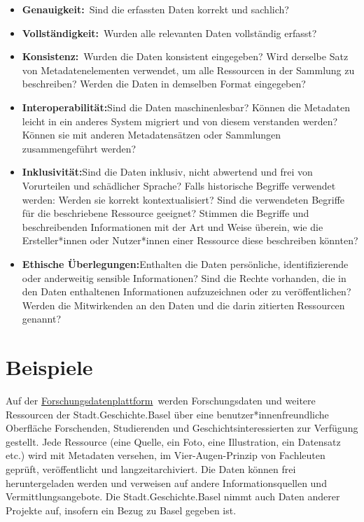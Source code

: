 \documentclass[
  letterpaper,
  DIV=11,
  numbers=noendperiod]{scrartcl}
\providecommand{\tightlist}{%
  \setlength{\itemsep}{0pt}\setlength{\parskip}{0pt}}\usepackage{longtable,booktabs,array}
\begin{document}
\begin{itemize}
\tightlist
\item
  \textbf{Genauigkeit:}~Sind die erfassten Daten korrekt und sachlich?
\item
  \textbf{Vollständigkeit:}~Wurden alle relevanten Daten vollständig
  erfasst?
\item
  \textbf{Konsistenz:}~Wurden die Daten konsistent eingegeben? Wird
  derselbe Satz von Metadatenelementen verwendet, um alle Ressourcen in
  der Sammlung zu beschreiben? Werden die Daten in demselben Format
  eingegeben?
\item
  \textbf{Interoperabilität:}Sind die Daten maschinenlesbar? Können die
  Metadaten leicht in ein anderes System migriert und von diesem
  verstanden werden? Können sie mit anderen Metadatensätzen oder
  Sammlungen zusammengeführt werden?
\item
  \textbf{Inklusivität:}Sind die Daten inklusiv, nicht abwertend und
  frei von Vorurteilen und schädlicher Sprache? Falls historische
  Begriffe verwendet werden: Werden sie korrekt kontextualisiert? Sind
  die verwendeten Begriffe für die beschriebene Ressource geeignet?
  Stimmen die Begriffe und beschreibenden Informationen mit der Art und
  Weise überein, wie die Ersteller*innen oder Nutzer*innen einer
  Ressource diese beschreiben könnten?
\item
  \textbf{Ethische Überlegungen:}Enthalten die Daten persönliche,
  identifizierende oder anderweitig sensible Informationen? Sind die
  Rechte vorhanden, die in den Daten enthaltenen Informationen
  aufzuzeichnen oder zu veröffentlichen? Werden die Mitwirkenden an den
  Daten und die darin zitierten Ressourcen genannt?
\end{itemize}

\section{Beispiele}\label{beispiele}

Auf der
\href{https://forschung.stadtgeschichtebasel.ch/}{Forschungsdatenplattform}~werden
Forschungsdaten und weitere Ressourcen der Stadt.Geschichte.Basel über
eine benutzer*innenfreundliche Oberfläche Forschenden, Studierenden und
Geschichtsinteressierten zur Verfügung gestellt. Jede Ressource (eine
Quelle, ein Foto, eine Illustration, ein Datensatz etc.) wird mit
Metadaten versehen, im Vier-Augen-Prinzip von Fachleuten geprüft,
veröffentlicht und langzeitarchiviert. Die Daten können frei
heruntergeladen werden und verweisen auf andere Informationsquellen und
Vermittlungsangebote. Die Stadt.Geschichte.Basel nimmt auch Daten
anderer Projekte auf, insofern ein Bezug zu Basel gegeben ist.
\end{document}
